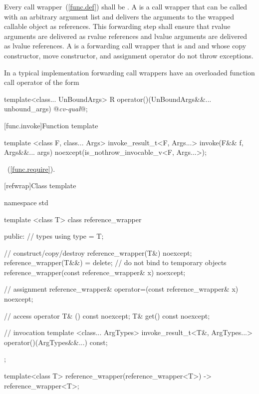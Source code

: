 \pnum
{}%
%
%
%
%
Every call wrapper~(\ref{func.def}) shall be
.
A  is a
call wrapper that can be called with an arbitrary argument list
and delivers the arguments to the wrapped callable object as references.
This forwarding step shall ensure that rvalue arguments are delivered as rvalue references
and lvalue arguments are delivered as lvalue references.
A  is a forwarding call wrapper that is
 and  and
whose copy constructor, move constructor, and assignment operator
do not throw exceptions.
\begin{note} In a typical implementation
forwarding call wrappers have an overloaded function call
operator of
the form

\begin{codeblock}
template<class... UnBoundArgs>
R operator()(UnBoundArgs&&... unbound_args) @\textit{cv-qual}@;
\end{codeblock}
\end{note}

[func.invoke]{Function template }
%
%
\begin{itemdecl}
template <class F, class... Args>
  invoke_result_t<F, Args...> invoke(F&& f, Args&&... args)
    noexcept(is_nothrow_invocable_v<F, Args...>);
\end{itemdecl}

\begin{itemdescr}
\pnum
\returns
{}~(\ref{func.require}).
\end{itemdescr}

[refwrap]{Class template }

%
%
\begin{codeblock}
namespace std {
  template <class T> class reference_wrapper {
  public:
    // types
    using type = T;

    // construct/copy/destroy
    reference_wrapper(T&) noexcept;
    reference_wrapper(T&&) = delete;    // do not bind to temporary objects
    reference_wrapper(const reference_wrapper& x) noexcept;

    // assignment
    reference_wrapper& operator=(const reference_wrapper& x) noexcept;

    // access
    operator T& () const noexcept;
    T& get() const noexcept;

    // invocation
    template <class... ArgTypes>
      invoke_result_t<T&, ArgTypes...> operator()(ArgTypes&&...) const;
  };

  template<class T>
    reference_wrapper(reference_wrapper<T>) -> reference_wrapper<T>;
}
\end{codeblock}

